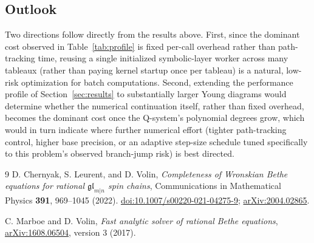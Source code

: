 \documentclass[11pt]{article}
\begin{document}
\subsection{Outlook}

Two directions follow directly from the results above. First, since the
dominant cost observed in Table~\ref{tab:profile} is fixed per-call
overhead rather than path-tracking time, reusing a single initialized
symbolic-layer worker across many tableaux (rather than paying kernel
startup once per tableau) is a natural, low-risk optimization for batch
computations. Second, extending the performance profile of
Section~\ref{sec:results} to substantially larger Young diagrams would
determine whether the numerical continuation itself, rather than fixed
overhead, becomes the dominant cost once the Q-system's polynomial
degrees grow, which would in turn indicate where further numerical
effort (tighter path-tracking control, higher base precision, or an
adaptive step-size schedule tuned specifically to this problem's
observed branch-jump risk) is best directed.


\begin{thebibliography}{9}
D. Chernyak, S. Leurent, and D. Volin,
\emph{Completeness of Wronskian Bethe equations for rational
$\mathfrak{gl}_{m|n}$ spin chains},
Communications in Mathematical Physics \textbf{391}, 969--1045 (2022).
\href{https://doi.org/10.1007/s00220-021-04275-9}{doi:10.1007/s00220-021-04275-9};
\href{https://arxiv.org/abs/2004.02865}{arXiv:2004.02865}.

C. Marboe and D. Volin,
\emph{Fast analytic solver of rational Bethe equations},
\href{https://arxiv.org/abs/1608.06504}{arXiv:1608.06504},
version 3 (2017).
\end{thebibliography}
\end{document}
